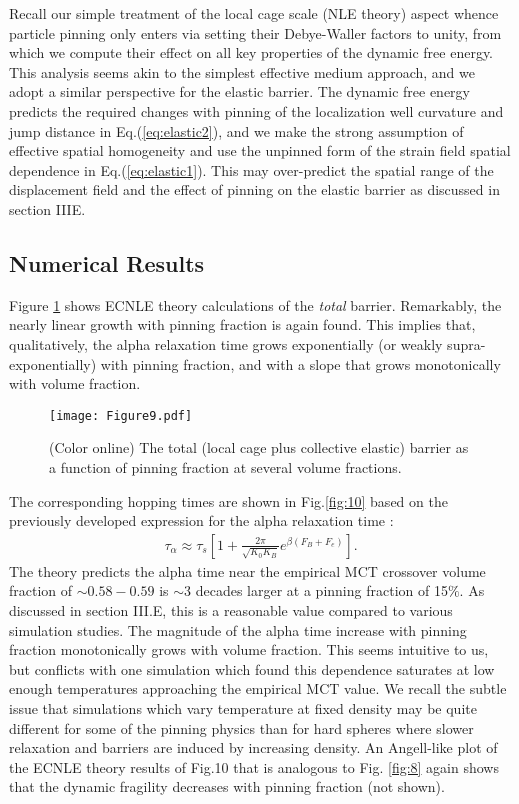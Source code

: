 \documentclass[twocolumn,showpacs,preprintnumbers,amsmath,amssymb,unsortedaddress,
]{revtex4-1}
\begin{document}
Recall our simple treatment of the local cage scale (NLE theory) aspect whence particle pinning only enters via setting their Debye-Waller factors to unity, from which we compute their effect on all key properties of the dynamic free energy. This analysis seems akin to the simplest effective medium approach, and we adopt a similar perspective for the elastic barrier. The dynamic free energy predicts the required changes with pinning of the localization well curvature and jump distance in Eq.(\ref{eq:elastic2}), and we make the strong assumption of effective spatial homogeneity and use the unpinned form of the strain field spatial dependence in Eq.(\ref{eq:elastic1}). This may over-predict the spatial range of the displacement field and the effect of pinning on the elastic barrier as discussed in section IIIE. 
\subsection{Numerical Results}
Figure \ref{fig:9} shows ECNLE theory calculations of the \emph{total} barrier. Remarkably, the nearly linear growth with pinning fraction is again found. This implies that, qualitatively, the alpha relaxation time grows exponentially (or weakly supra-exponentially) with pinning fraction, and with a slope that grows monotonically with volume fraction.

\begin{figure}[htp]
\center
\texttt{[image: Figure9.pdf]}
\caption{\label{fig:9}(Color online) The total (local cage plus collective elastic) barrier as a function of pinning fraction at several volume fractions.}
\end{figure}

The corresponding hopping times are shown in Fig.\ref{fig:10} based on the previously developed expression for the alpha relaxation time \cite{7,8}:
\begin{eqnarray}
\tau_\alpha \approx \tau_s\left[1+\frac{2\pi}{\sqrt{K_0K_B}}e^{\beta(F_B+F_e)} \right].
\label{eq:41}
\end{eqnarray}
The theory predicts the alpha time near the empirical MCT crossover volume fraction of $\sim 0.58-0.59$ is $\sim 3$ decades larger at a pinning fraction of 15$\%$. As discussed in section III.E, this is a reasonable value compared to various simulation studies. The magnitude of the alpha time increase with pinning fraction monotonically grows with volume fraction. This seems intuitive to us, but conflicts with one simulation \cite{25} which found this dependence saturates at low enough temperatures approaching the empirical MCT value. We recall the subtle issue that simulations which vary temperature at fixed density may be quite different for some of the pinning physics than for hard spheres where slower relaxation and barriers are induced by increasing density. An Angell-like plot of the ECNLE theory results of Fig.10 that is analogous to Fig. \ref{fig:8} again shows that the dynamic fragility decreases with pinning fraction (not shown).
\end{document}
